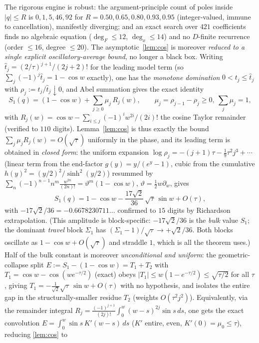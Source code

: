 \documentclass[11pt,a4paper]{article}
\theoremstyle{remark}
\theoremstyle{plain}
\begin{document}
The rigorous engine is robust: the argument-principle count of poles
inside $|q| \le R$ is $0, 1, 5, 46, 92$ for $R = 0.50, 0.65, 0.80, 0.93,
0.95$ (integer-valued, immune to cancellation), manifestly diverging; and
an exact search over $421$ coefficients finds no algebraic equation
($\deg_F \le 12$, $\deg_x \le 14$) and no $D$-finite recurrence (order
$\le 16$, degree $\le 20$).  The asymptotic~\eqref{lem:cos} is moreover
\emph{reduced to a single explicit oscillatory-average bound}, no longer a
black box.  Writing $\hat t_j = (2/\tau)^{j+1}/(2j+2)!$ for the leading
model term (so $\sum_j (-1)^j \hat t_j = 1 - \cos w$ exactly), one has the
\emph{monotone domination} $0 < t_j \le \hat t_j$ with
$\rho_j := t_j/\hat t_j \downarrow 0$, and Abel summation gives the exact
identity
\[
  S_1(q) = (1 - \cos w) + \sum_{j\ge0} \mu_j\, R_j(w),
  \qquad \mu_j = \rho_{j-1} - \rho_j \ge 0,\ \textstyle\sum_j \mu_j = 1,
\]
with $R_j(w) = \cos w - \sum_{i\le j} (-1)^i w^{2i}/(2i)!$ the cosine
Taylor remainder (verified to $110$ digits).  Lemma~\ref{lem:cos} is thus
exactly the bound $\sum_j \mu_j R_j(w) = O(\sqrt\tau)$ uniformly in the
phase, and its leading term is obtained in \emph{closed form}: the uniform
expansion $\log\rho_j = -(j{+}1)\tau - \tfrac19\tau^2 j^3 + \cdots$ (linear
term from the end-factor $g(y)=y/(e^y-1)$, cubic from the cumulative
$h(y)^2 = (y/2)^2/\sinh^2(y/2)$) resummed by
$\sum_n (-1)^{n-1} n^m \tfrac{w^{2n}}{(2n)!} = \vartheta^m(1-\cos w)$,
$\vartheta = \tfrac12 w\partial_w$, gives
\[
  S_1(q) = 1 - \cos w - \frac{17\sqrt2}{36}\,\sqrt\tau\,\sin w + O(\tau),
\]
with $-17\sqrt2/36 = -0.6678230711\ldots$ confirmed to $15$ digits by
Richardson extrapolation.  (This amplitude is block-specific: $-17\sqrt2/36$
is the \emph{bulk} value $S_1$; the dominant \emph{travel} block $\Sigma_1$
has $(\Sigma_1-1)/\sqrt\tau \to +\sqrt2/36$.  Both blocks oscillate as
$1-\cos w + O(\sqrt\tau)$ and straddle $1$, which is all the theorem uses.)
Half of the bulk constant is moreover
\emph{unconditional and uniform}: the geometric-collapse split
$E := S_1 - (1-\cos w) = T_1 + T_2$ with
$T_1 = \cos w - \cos(w e^{-\tau/2})$ (exact) obeys
$|T_1| \le w(1-e^{-\tau/2}) \le \sqrt{\tau/2}$ for all $\tau$, giving
$T_1 = -\tfrac1{\sqrt2}\sqrt\tau\,\sin w + O(\tau)$ with no hypothesis, and
isolates the entire gap in the structurally-smaller residue $T_2$ (weights
$O(\tau^2 j^2)$).  Equivalently, via the remainder integral
$R_j = \tfrac{(-1)^{j+1}}{(2j)!}\int_0^w (w-s)^{2j}\sin s\,ds$, one gets the
exact convolution $E = \int_0^w \sin s\,K'(w-s)\,ds$ ($K'$ entire, even,
$K'(0)=\mu_0 \le \tau$), reducing \eqref{lem:cos} to
\end{document}
